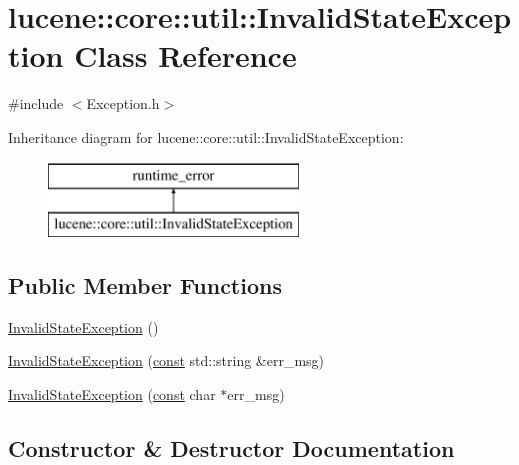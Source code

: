 \hypertarget{classlucene_1_1core_1_1util_1_1InvalidStateException}{}\section{lucene\+:\+:core\+:\+:util\+:\+:Invalid\+State\+Exception Class Reference}
\label{classlucene_1_1core_1_1util_1_1InvalidStateException}


{\ttfamily \#include $<$Exception.\+h$>$}

Inheritance diagram for lucene\+:\+:core\+:\+:util\+:\+:Invalid\+State\+Exception\+:\begin{figure}[H]
\begin{center}
\leavevmode
\includegraphics[height=2.000000cm]{classlucene_1_1core_1_1util_1_1InvalidStateException}
\end{center}
\end{figure}
\subsection*{Public Member Functions}
\begin{DoxyCompactItemize}
\item 
\mbox{\hyperlink{classlucene_1_1core_1_1util_1_1InvalidStateException_ad9800361279f318a133ba1105ca0402a}{Invalid\+State\+Exception}} ()
\item 
\mbox{\hyperlink{classlucene_1_1core_1_1util_1_1InvalidStateException_a888988bcc8fae5b89180c295bde0085c}{Invalid\+State\+Exception}} (\mbox{\hyperlink{ZlibCrc32_8h_a2c212835823e3c54a8ab6d95c652660e}{const}} std\+::string \&err\+\_\+msg)
\item 
\mbox{\hyperlink{classlucene_1_1core_1_1util_1_1InvalidStateException_a91f4fcc970f3b64914872566a5bb4a05}{Invalid\+State\+Exception}} (\mbox{\hyperlink{ZlibCrc32_8h_a2c212835823e3c54a8ab6d95c652660e}{const}} char $\ast$err\+\_\+msg)
\end{DoxyCompactItemize}


\subsection{Constructor \& Destructor Documentation}
\mbox{\label{classlucene_1_1core_1_1util_1_1InvalidStateException_ad9800361279f318a133ba1105ca0402a}} 
